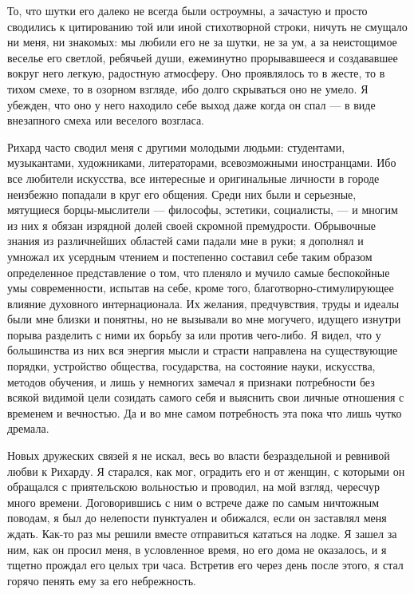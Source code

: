 То, что шутки его далеко не всегда были остроумны, а зачастую и просто
сводились к  цитированию той или  иной стихотворной строки,  ничуть не
смущало ни  меня, ни знакомых:  мы любили его не  за шутки, не  за ум,
а  за  неистощимое  веселье  его светлой,  ребячьей  души,  ежеминутно
прорывавшееся и  создававшее вокруг него легкую,  радостную атмосферу.
Оно проявлялось  то в жесте, то  в тихом смехе, то  в озорном взгляде,
ибо долго скрываться оно не умело.  Я убежден, что оно у него находило
себе выход даже когда он спал --- в виде внезапного смеха или веселого
возгласа.

Рихард  часто  сводил  меня  с другими  молодыми  людьми:  студентами,
музыкантами,  художниками,  литераторами, всевозможными  иностранцами.
Ибо  все любители  искусства, все  интересные и  оригинальные личности
в  городе  неизбежно попадали  в  круг  его  общения. Среди  них  были
и  серьезные,   мятущиеся  борцы-мыслители  ---   философы,  эстетики,
социалисты,  ---  и  многим  из  них я  обязан  изрядной  долей  своей
скромной премудрости. Обрывочные знания  из различнейших областей сами
падали  мне  в руки;  я  дополнял  и  умножал  их усердным  чтением  и
постепенно составил  себе таким  образом определенное  представление о
том, что пленяло и мучило самые беспокойные умы современности, испытав
на  себе,  кроме  того,  благотворно-стимулирующее  влияние  духовного
интернационала.  Их желания,  предчувствия,  труды и  идеалы были  мне
близки  и понятны,  но не  вызывали во  мне могучего,  идущего изнутри
порыва разделить  с ними их борьбу  за или против чего-либо.  Я видел,
что у  большинства из них  вся энергия  мысли и страсти  направлена на
существующие порядки,  устройство общества, государства,  на состояние
науки,  искусства,  методов обучения,  и  лишь  у немногих  замечал  я
признаки потребности  без всякой видимой  цели созидать самого  себя и
выяснить свои  личные отношения с  временем и  вечностью. Да и  во мне
самом потребность эта пока что лишь чутко дремала.

Новых  дружеских связей  я не  искал, весь  во власти  безраздельной и
ревнивой  любви к  Рихарду. Я  старался, как  мог, оградить  его и  от
женщин, с которыми он обращался  с приятельскою вольностью и проводил,
на мой взгляд,  чересчур много времени. Договорившись с  ним о встрече
даже  по самым  ничтожным поводам,  я  был до  нелепости пунктуален  и
обижался, если  он заставлял меня  ждать. Как-то раз мы  решили вместе
отправиться кататься на  лодке. Я зашел за ним, как  он просил меня, в
условленное время,  но его дома не  оказалось, и я тщетно  прождал его
целых три  часа. Встретив его  через день  после этого, я  стал горячо
пенять ему за его небрежность.

